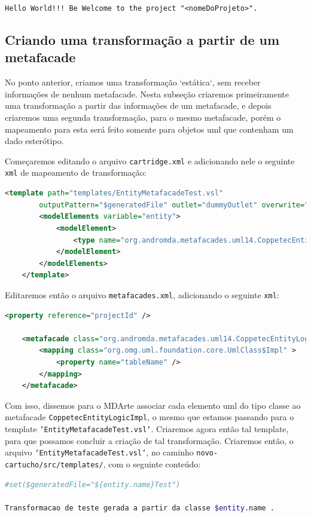 \texttt{Hello World!!! Be Welcome to the project "<nomeDoProjeto>".}

\subsection{Criando uma transformação a partir de um metafacade}
No ponto anterior, criamos uma transformação `estática`, sem receber informações
de nenhum metafacade. Nesta subseção criaremos primeiramente uma transformação a
partir das informações de um metafacade, e depois criaremos uma segunda
transformação, para o mesmo metafacade, porém o mapeamento para esta será feito
somente para objetos uml que contenham um dado esterótipo.

Começaremos editando o arquivo \texttt{cartridge.xml} e adicionando nele o
seguinte \texttt{xml} de mapeamento de transformação:

\begin{lstlisting}[language=xml]
	<template path="templates/EntityMetafacadeTest.vsl"
		outputPattern="$generatedFile" outlet="dummyOutlet" overwrite="true">
		<modelElements variable="entity">
            <modelElement>
                <type name="org.andromda.metafacades.uml14.CoppetecEntityLogicImpl" />
            </modelElement>
        </modelElements>
	</template>
\end{lstlisting}

Editaremos então o arquivo \texttt{metafacades.xml}, adicionando o seguinte
\texttt{xml}:

\begin{lstlisting}[language=xml]
    <property reference="projectId" />
	
    <metafacade class="org.andromda.metafacades.uml14.CoppetecEntityLogicImpl">
        <mapping class="org.omg.uml.foundation.core.UmlClass$Impl" >
        	<property name="tableName" />
        </mapping>
    </metafacade>
\end{lstlisting}

Com isso, dissemos para o MDArte associar cada elemento uml do tipo classe ao
metafacade \texttt{CoppetecEntityLogicImpl}, o mesmo que estamos passando para o
template \texttt{`EntityMetafacadeTest.vsl`}. Criaremos agora então tal
template, para que possamos concluir a criação de tal transformação. Criaremos
então, o arquivo \texttt{`EntityMetafacadeTest.vsl`}, no caminho
\texttt{novo-cartucho/src/templates/}, com o seguinte conteúdo:

\begin{lstlisting}[language=bash]
#set($generatedFile="${entity.name}Test")

Transformacao de teste gerada a partir da classe $entity.name .
\end{lstlisting}

